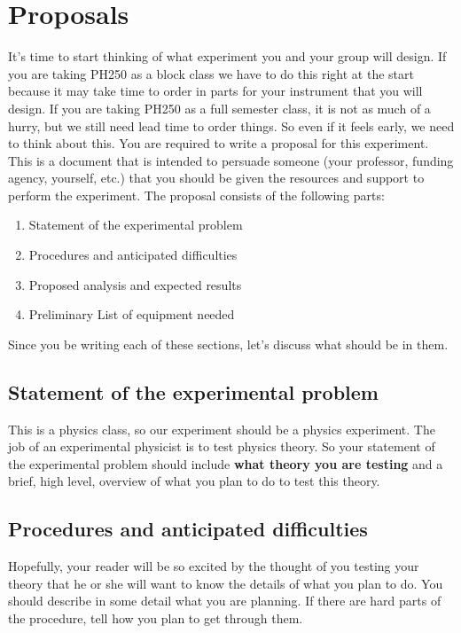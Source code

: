 \section{Proposals}

It's time to start thinking of what experiment you and your group will design. If you are taking PH250 as a block class we have to do this right at the start because it may take time to order in parts for your instrument that you will design. If you are taking PH250 as a full semester class, it is not as much of a hurry, but we still need lead time to order things. So even if it feels early, we need to think about this. You are required to write a proposal for this experiment. This is a document that is intended to persuade someone (your professor,  funding agency, yourself, etc.) that you should be given the resources and support to perform the experiment. The proposal consists of the following parts:

\begin{enumerate}
	\item Statement of the experimental problem
	
	\item Procedures and anticipated difficulties
	
	\item Proposed analysis and expected results
	
	\item Preliminary List of equipment needed
\end{enumerate}

\noindent Since you be writing each of these sections, let's discuss what should be in them.

\subsection{Statement of the experimental problem}

This is a physics class, so our experiment should be a physics experiment. The job of an experimental physicist is to test physics theory. So your statement of the experimental problem should include \textbf{what theory you are testing} and a brief, high level, overview of what you plan to do to test this theory.

\subsection{Procedures and anticipated difficulties}

Hopefully, your reader will be so excited by the thought of you testing your theory that he or she will want to know the details of what you plan to do. You should describe in some detail what you are planning. If there are hard parts of the procedure, tell how you plan to get through them.


